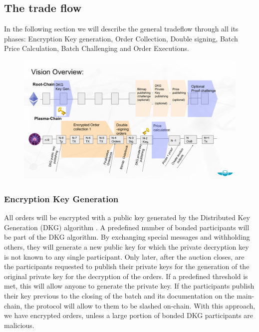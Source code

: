 \documentclass[11pt,parskip=full]{scrartcl}%
\begin{document}
\subsection{The trade flow}
\label{subsec:data}

In the following section we will describe the general tradeflow through all its phases: Encryption Key generation, Order Collection, Double signing, Batch Price Calculation, Batch Challenging and Order Executions.

\begin{figure}
\centering
\includegraphics[width=\textwidth]{overview_tradeflow.png}
\end{figure}



\subsubsection{Encryption Key Generation}
All orders will be encrypted with a public key generated by the Distributed Key Generation (DKG) algorithm \cite{DKG}. 
A predefined number of bonded participants will be part of the DKG algorithm. 
By exchanging special messages and withholding others, they will generate a new public key for which the private decryption key is not known to any single participant. 
Only later, after the auction closes, are the participants requested to publish their private keys for the generation of the original private key for the decryption of the orders. 
If a predefined threshold is met, this will allow anyone to generate the private key. 
If the participants publish their key previous to the closing of the batch and its documentation on the main-chain, the protocol will allow to them to be slashed on-chain. 
With this approach, we have encrypted orders, unless a large portion of bonded DKG participants are malicious. 
\end{document}

